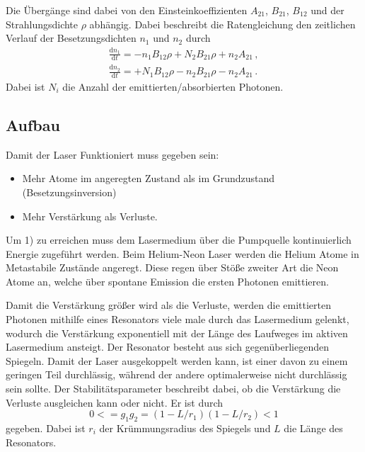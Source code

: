 Die Übergänge sind dabei von den Einsteinkoeffizienten $A_{21}$, $B_{21}$, $B_{12}$ und der Strahlungsdichte $\rho$ abhängig.
Dabei beschreibt die Ratengleichung den zeitlichen Verlauf der Besetzungsdichten $n_1$ und $n_2$ durch
\begin{align*}
	\frac{\mathrm{d}n_1}{\mathrm{d}t} = -n_1 B_{12} \rho + N_2 B_{21} \rho + n_2 A_{21}\,,\\
	\frac{\mathrm{d}n_2}{\mathrm{d}t} = +N_1 B_{12} \rho - n_2 B_{21} \rho - n_2 A_{21}\,.
\end{align*}
Dabei ist $N_i$ die Anzahl der emittierten/absorbierten Photonen.

\subsection{Aufbau} %
\label{sub:aufbau}


Damit der Laser Funktioniert muss gegeben sein:
\begin{itemize}
	\item Mehr Atome im angeregten Zustand als im Grundzustand (Besetzungsinversion)
	\item Mehr Verstärkung als Verluste.
\end{itemize}

Um 1) zu erreichen muss dem Lasermedium über die Pumpquelle kontinuierlich Energie zugeführt werden.
Beim Helium-Neon Laser werden die Helium Atome in Metastabile Zustände angeregt.
Diese regen über Stöße zweiter Art die Neon Atome an, welche über spontane Emission die ersten Photonen emittieren.

Damit die Verstärkung größer wird als die Verluste, werden die emittierten Photonen mithilfe eines Resonators viele male durch das Lasermedium gelenkt, wodurch die Verstärkung exponentiell mit der Länge des Laufweges im aktiven Lasermedium ansteigt.
Der Resonator besteht aus sich gegenüberliegenden Spiegeln.
Damit der Laser ausgekoppelt werden kann, ist einer davon zu einem geringen Teil durchlässig, während der andere optimalerweise nicht durchlässig sein sollte.
Der Stabilitätsparameter beschreibt dabei, ob die Verstärkung die Verluste ausgleichen kann oder nicht. 
Er ist durch 
\begin{equation*}
	0 <= g_1 g_2 = (1-L/r_1)(1-L/r_2) < 1
\end{equation*}
gegeben.
Dabei ist $r_i$ der Krümmungsradius des Spiegels und $L$ die Länge des Resonators.


